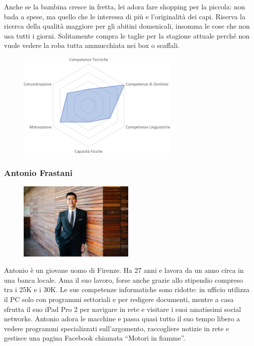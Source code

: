 \documentclass[12pt,italian,]{report}
\begin{document}
Anche se la bambina cresce in fretta, lei adora fare shopping per la
piccola: non bada a spese, ma quello che le interessa di più e
l'originalità dei capi. Riserva la ricerca della qualità maggiore per
gli abitini domenicali, insomma le cose che non usa tutti i giorni.
Solitamente compra le taglie per la stagione attuale perché non vuole
vedere la roba tutta ammucchiata nei box o scaffali.

\begin{figure}[h]
\centering
\includegraphics[width=0.7\textwidth,height=\textheight]{img/severina_competenze.png}
\end{figure}

\newpage
\hypertarget{antonio-frastani-1}{%
\subsubsection{Antonio Frastani}\label{antonio-frastani-1}}

\begin{figure}[h]
\centering
\includegraphics[width=0.5\textwidth,height=\textheight]{img/antonio.jpeg}
\end{figure}

Antonio è un giovane uomo di Firenze. Ha 27 anni e lavora da un anno
circa in una banca locale. Ama il suo lavoro, forse anche grazie allo
stipendio compreso tra i 25K e i 30K. Le sue competenze informatiche
sono ridotte: in ufficio utilizza il PC solo con programmi settoriali e
per redigere documenti, mentre a casa sfrutta il suo iPad Pro 2 per
navigare in rete e visitare i suoi amatissimi social networks. Antonio
adora le macchine e passa quasi tutto il suo tempo libero a vedere
programmi specializzati sull'argomento, raccogliere notizie in rete e
gestisce una pagina Facebook chiamata ``Motori in fiamme''.
\end{document}
